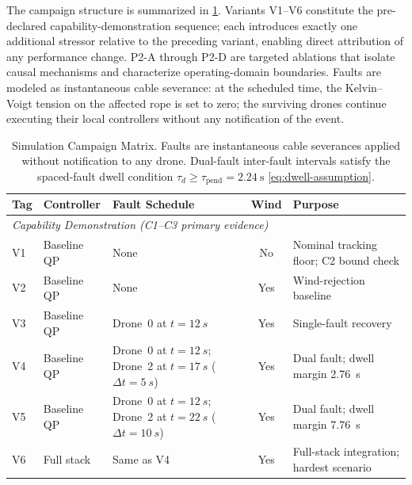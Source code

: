 The campaign structure is summarized in \cref{tab:campaign-matrix}. Variants V1--V6 constitute the pre-declared capability-demonstration sequence; each introduces exactly one additional stressor relative to the preceding variant, enabling direct attribution of any performance change. P2-A through P2-D are targeted ablations that isolate causal mechanisms and characterize operating-domain boundaries. Faults are modeled as instantaneous cable severance: at the scheduled time, the Kelvin--Voigt tension on the affected rope is set to zero; the surviving drones continue executing their local controllers without any notification of the event.

\begin{table}[htbp]
  \caption{%
    Simulation Campaign Matrix. Faults are instantaneous cable severances applied without notification to any drone. Dual-fault inter-fault intervals satisfy the spaced-fault dwell condition $\tau_d \ge \tau_{\mathrm{pend}} = \SI{2.24}{\second}$ \eqref{eq:dwell-assumption}.%
  }
  \label{tab:campaign-matrix}
  \centering
  \begin{tabular}{llp{5.5cm}cp{5cm}}
    \toprule
    Tag & Controller            & Fault Schedule                                                                          & Wind & Purpose \\
    \midrule
    \multicolumn{5}{l}{\textit{Capability Demonstration (C1--C3 primary evidence)}} \\[\smallskipamount]
    V1 & Baseline QP           & None                                                                                    & No   & Nominal tracking floor; C2 bound check \\
    V2 & Baseline QP           & None                                                                                    & Yes  & Wind-rejection baseline \\
    V3 & Baseline QP           & Drone~0 at $t{=}\SI{12}{s}$                                                             & Yes  & Single-fault recovery \\
    V4 & Baseline QP           & Drone~0 at $t{=}\SI{12}{s}$; Drone~2 at $t{=}\SI{17}{s}$ \mbox{($\Delta t{=}\SI{5}{s}$)}  & Yes  & Dual fault; dwell margin \SI{2.76}{s} \\
    V5 & Baseline QP           & Drone~0 at $t{=}\SI{12}{s}$; Drone~2 at $t{=}\SI{22}{s}$ \mbox{($\Delta t{=}\SI{10}{s}$)} & Yes  & Dual fault; dwell margin \SI{7.76}{s} \\
    V6 & Full stack            & Same as V4                                                                              & Yes  & Full-stack integration; hardest scenario \\

\end{tabular}
\end{table}
